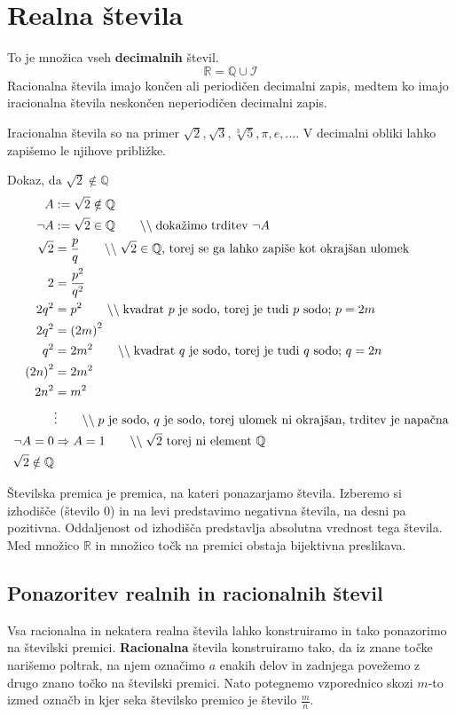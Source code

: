\documentclass[a4paper,oneside,12pt,fleqn]{article}
\def\R{\ensuremath{\mathbb R}}
\def\Q{\ensuremath{\mathbb Q}}
\newcommand{\comment}[1]{\ensuremath{\qquad\backslash\backslash\;}\textnormal{#1}}
\numberwithin{equation}{section}
\begin{document}
\section{Realna števila}
To je množica vseh \textbf{decimalnih} števil.
\[ \R = \Q \cup \mathcal I \]
Racionalna števila imajo končen ali periodičen decimalni zapis, medtem ko imajo iracionalna števila
neskončen neperiodičen decimalni zapis.

Iracionalna števila so na primer $\sqrt{2}, \sqrt{3}, \sqrt[3]{5}, \pi, e, \ldots$. V decimalni
obliki lahko zapišemo le njihove približke. 

Dokaz, da $\sqrt{2} \notin \Q$
\begin{align*}
  A &:= \sqrt{2} \notin \Q \\
  \neg A &:= \sqrt{2} \in \Q  \comment{dokažimo trditev $\neg A$} \\
  \sqrt{2} &=  \frac{p}{q} \comment{$\sqrt{2} \in \Q$, torej se ga lahko zapiše kot okrajšan ulomek} \\
  2 &= \frac{p^2}{q^2} \\
  2q^2 &= p^2 \comment{kvadrat $p$ je sodo, torej je tudi $p$ sodo; $p = 2m$} \\
  2q^2 &= \left( 2m \right)^2 \\
  q^2 &= 2m^2 \comment{kvadrat $q$ je sodo, torej je tudi $q$ sodo; $q = 2n$} \\
  \left( 2n \right)^2 &=  2m^2 \\
  2n^2 &= m^2 \\
  &\vdots \comment{$p$ je sodo, $q$ je sodo, torej ulomek ni okrajšan, trditev je napačna} \\
  \neg A = 0 &\Rightarrow A = 1 \comment{$\sqrt{2}$ torej ni element \Q} \\
  \sqrt{2} \notin \Q 
\end{align*}

Številska premica je premica, na kateri ponazarjamo števila. Izberemo si izhodišče (število 0) in na levi
predstavimo negativna števila, na desni pa pozitivna. Oddaljenost od izhodišča predstavlja absolutna
vrednost tega števila. Med množico \R{} in množico točk na premici obstaja bijektivna preslikava.

\subsection{Ponazoritev realnih in racionalnih števil}
Vsa racionalna in nekatera realna števila lahko konstruiramo in tako ponazorimo na številski
premici. \textbf{Racionalna} števila konstruiramo tako, da iz znane točke narišemo poltrak, na njem označimo
$a$ enakih delov in zadnjega povežemo z drugo znano točko na številski premici. Nato potegnemo
vzporednico skozi $m$-to izmed označb in kjer seka številsko premico je število $\frac{m}{n}$.
\end{document}
